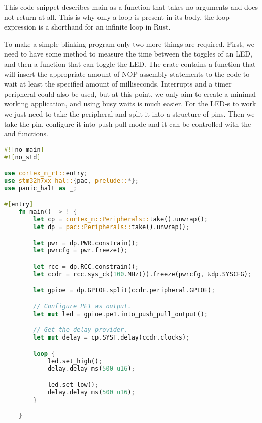 This code snippet describes main as a function that takes no arguments and does not return at all. This is why only a loop is present in its body, the loop expression is a shorthand for an infinite loop in Rust.

To make a simple blinking program only two more things are required. First, we need to have some method to measure the time between the toggles of an LED, and then a function that can toggle the LED. The  crate contains a  function that will insert the appropriate amount of NOP assembly statements to the code to wait at least the specified amount of milliseconds. Interrupts and a timer peripheral could also be used, but at this point, we only aim to create a minimal working application, and using busy waits is much easier. For the LED-s to work we just need to take the  peripheral and split it into a structure of pins. Then we take the  pin, configure it into push-pull mode and it can be controlled with the  and  functions.

\begin{lstlisting}[language=Rust,frame=single,float=!ht,style=customrust,label={lst:embedded-hello-world},caption={Embedded Hello World (Blink) in Rust}]
#![no_main]
#![no_std]

use cortex_m_rt::entry;
use stm32h7xx_hal::{pac, prelude::*};
use panic_halt as _;

#[entry]
    fn main() -> ! {
        let cp = cortex_m::Peripherals::take().unwrap();
        let dp = pac::Peripherals::take().unwrap();

        let pwr = dp.PWR.constrain();
        let pwrcfg = pwr.freeze();

        let rcc = dp.RCC.constrain();
        let ccdr = rcc.sys_ck(100.MHz()).freeze(pwrcfg, &dp.SYSCFG);

        let gpioe = dp.GPIOE.split(ccdr.peripheral.GPIOE);

        // Configure PE1 as output.
        let mut led = gpioe.pe1.into_push_pull_output();

        // Get the delay provider.
        let mut delay = cp.SYST.delay(ccdr.clocks);

        loop {
            led.set_high();
            delay.delay_ms(500_u16);

            led.set_low();
            delay.delay_ms(500_u16);
        }

    }
\end{lstlisting}

